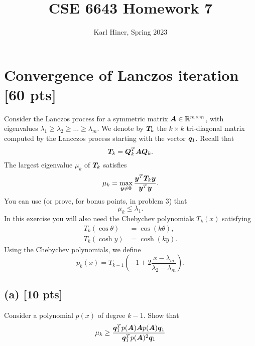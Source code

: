 \documentclass[twoside,10pt]{article}
\begin{document}
\title{CSE 6643 Homework 7}
\author{Karl Hiner, Spring 2023}
\date{}
\maketitle

\section{Convergence of Lanczos iteration [60 pts]}
Consider the Lanczos process for a symmetric matrix $\bm{A} \in \mathbb{R}^{m \times m}$, with eigenvalues $\lambda_{1} \geq \lambda_{2} \geq \dots \geq \lambda_{m}$.  
We denote by $\bm{T}_k$ the $k \times k$ tri-diagonal matrix computed by the Lancczos process starting with the vector $\bm{q}_1$. 
Recall that
\begin{equation}
  \bm{T}_k = \bm{Q}^T_k \bm{A} \bm{Q}_k.
\end{equation}
The largest eigenvalue $\mu_k$ of $\bm{T}_k$ satisfies
\begin{equation}
  \mu_{k} = \max \limits_{\bm{y} \neq \bm{0}} \frac{\bm{y}^T \bm{T}_k \bm{y}}{\bm{y}^T \bm{y}}.
\end{equation}
You can use (or prove, for bonus points, in problem 3) that 
\begin{equation}
  \mu_{k} \leq \lambda_1.
\end{equation}
In this exercise you will also need the Chebychev polynomials $T_k(x)$ satisfying  
\begin{align}
  T_k\left(\cos \theta\right) &= \cos\left(k \theta \right),\\
  T_k\left(\cosh y\right) &= \cosh\left(k y \right).
\end{align}
Using the Chebychev polynomials, we define 
\begin{equation}
  p_k(x) = T_{k - 1} \left( - 1 + 2 \frac{x - \lambda_m}{\lambda_2 - \lambda_m}\right).
\end{equation}

\subsection*{(a) [10 pts]}
Consider a polynomial $p(x)$ of degree $k - 1$.
Show that
\begin{equation}
  \mu_k \geq \frac{\bm{q}_1^T p(\bm{A}) \bm{A} p(\bm{A}) \bm{q}_1}{\bm{q}_1^T p(\bm{A})^2 \bm{q}_1}
\end{equation}
\end{document}
